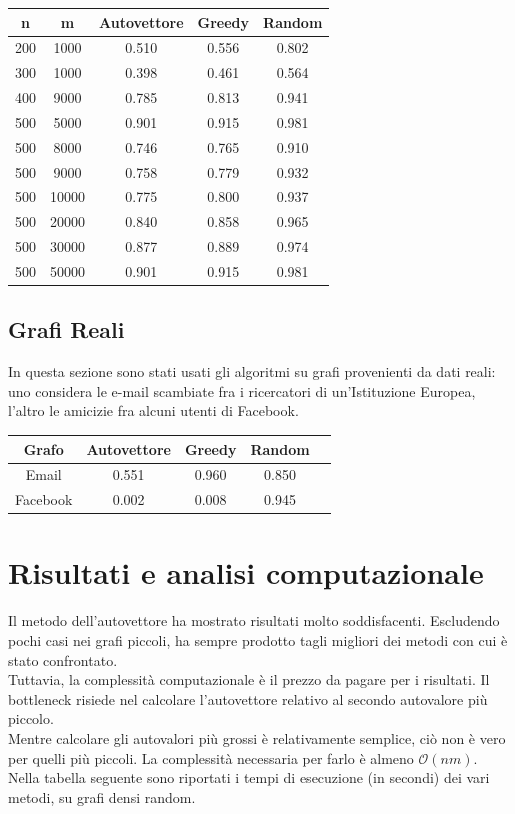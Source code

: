 \documentclass{article}
\begin{document}
\begin{center}
    \begin{tabular}{|c|c|c|c|c|}
        \hline
        n & m & Autovettore & Greedy & Random \\
        \hline
        \hline
        200 & 1000 & 0.510 & 0.556 & 0.802 \\
        300 & 1000 & 0.398 & 0.461 & 0.564 \\
        400 & 9000 & 0.785 & 0.813 & 0.941 \\
        500 & 5000 & 0.901 & 0.915 & 0.981 \\
        500 & 8000 & 0.746 & 0.765 & 0.910 \\
        500 & 9000 & 0.758 & 0.779 & 0.932 \\
        500 & 10000 & 0.775 & 0.800 & 0.937 \\
        500 & 20000 & 0.840 & 0.858 & 0.965 \\
        500 & 30000 & 0.877 & 0.889 & 0.974 \\
        500 & 50000 & 0.901 & 0.915 & 0.981 \\
        \hline
    \end{tabular}
\end{center}

\subsection{Grafi Reali}

In questa sezione sono stati usati gli algoritmi su grafi provenienti da dati reali:
uno considera le e-mail scambiate fra i ricercatori di un'Istituzione Europea, l'altro le amicizie fra alcuni utenti di Facebook.

\begin{center}
    \begin{tabular}{|c|c|c|c|c|}
        \hline
        Grafo & Autovettore & Greedy & Random \\
        \hline
        \hline
        Email & 0.551 & 0.960 & 0.850 \\
        Facebook & 0.002 & 0.008 & 0.945 \\
        \hline
    \end{tabular}
\end{center}


\section{Risultati e analisi computazionale}
Il metodo dell'autovettore ha mostrato risultati molto soddisfacenti. Escludendo pochi casi nei grafi piccoli, ha sempre prodotto tagli migliori dei metodi con cui \`e stato confrontato.\\
Tuttavia, la complessit\`a computazionale \`e il prezzo da pagare per i risultati. Il bottleneck risiede nel calcolare l'autovettore relativo al secondo autovalore pi\`u piccolo.\\
Mentre calcolare gli autovalori pi\`u grossi \`e relativamente semplice, ci\`o non \`e vero per quelli pi\`u piccoli. La complessit\`a necessaria per farlo \`e almeno $\mathcal{O}(nm)$.
Nella tabella seguente sono riportati i tempi di esecuzione (in secondi) dei vari metodi, su grafi densi random.
\end{document}
